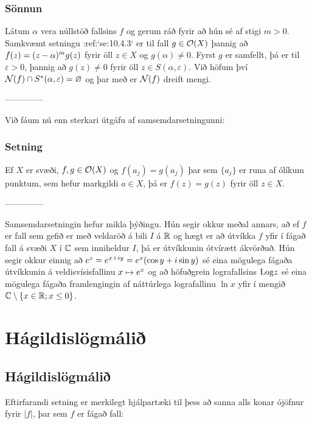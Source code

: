 \subsubsection{Sönnun} Látum $\alpha$ vera núllstöð fallsins $f$ og gerum ráð fyrir að
hún sé af stigi $m>0$.  Samkvæmt setningu :ref:`se:10.4.3` er til fall
$g\in {\cal O}(X)$ þannig að $f(z)=(z-\alpha)\sp mg(z)$ fyrir öll $z\in X$
og $g(\alpha)\neq 0$.  Fyrst $g$ er samfellt, þá er til
$\varepsilon>0$, þannig að $g(z)\neq 0$ fyrir öll $z\in
S(\alpha,\varepsilon)$.  Við höfum því ${\cal N}(f)\cap S^\ast
(\alpha,\varepsilon)=\varnothing$ og þar með er ${\cal N}(f)$ dreift
mengi. 


--------------



\medskip
Við fáum nú enn sterkari útgáfu af samsemdarsetningunni:

\subsubsection{Setning}   
Ef $X$ er svæði, $f,g\in {\cal O}(X)$ og $f(a_j)=g(a_j)$ þar sem
$\{a_j\}$ er runa af ólíkum punktum, sem hefur markgildi $a\in X$,
þá er $f(z)=g(z)$ fyrir öll $z\in X$.  


--------------



\medskip
Samsemdarsetningin hefur mikla þýðingu.  Hún segir okkur meðal
annars, að ef $f$ er fall sem gefið er með veldaröð á bili $I$ á ${\mathbb R}$
og hægt er að útvíkka $f$ yfir í fágað fall á svæði $X$ í ${\mathbb C}$ sem
inniheldur $I$, þá er útvíkkunin ótvírætt ákvörðuð.  
Hún segir okkur einnig að 
$e\sp z=e\sp{x+iy}=e\sp x(\cos y+i\sin y)$ sé eina mögulega fágaða
útvíkkunin á veldisvísisfallinu $x\mapsto e\sp x$ og að höfuðgrein
lografallsins ${\operatorname{Log}} z$ sé eina mögulega fágaða framlengingin af
náttúrlega lografallinu $\ln x$ yfir í mengið ${\mathbb C}\setminus\{x\in
{\mathbb R}; x\leq 0\}$.  



\section{Hágildislögmálið}

\subsection{Hágildislögmálið}

\noindent
Eftirfarandi setning er merkilegt hjálpartæki til þess að sanna alls
konar ójöfnur fyrir $|f|$, þar sem $f$ er fágað fall:



